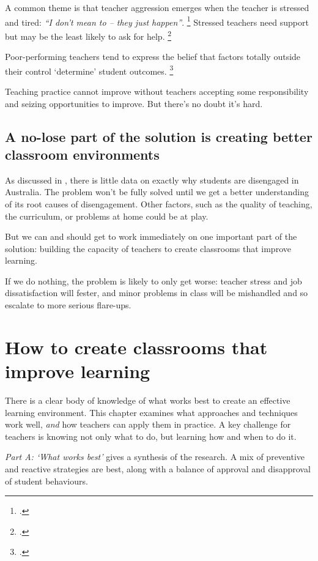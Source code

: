 \documentclass{grattan}
\begin{document}
A common theme is that teacher aggression emerges when the teacher is stressed and tired: \emph{``I don't mean to -- they just happen''}.%
    \footcite{RileyBrew2010WhyDidYouDoThat}
Stressed teachers need support but may be the least likely to ask for help.%
    \footcite{Lewis2001ClassroomDisciplineStudent}

Poor-performing teachers tend to express the belief that factors totally outside their control `determine' student outcomes.%
    \footcite{Lingard2001QueenslandSchoolReformFinalReport}

Teaching practice cannot improve without teachers accepting some responsibility and seizing opportunities to improve.
But there's no doubt it's hard.

\section{A no-lose part of the solution is creating better classroom environments}\label{sec:no-lose-part-of-solution}
As discussed in , there is little data on exactly why students are disengaged in Australia. The problem won't be fully solved until we get a better understanding of its root causes of disengagement. Other factors, such as the quality of teaching, the curriculum, or problems at home could be at play.

But we can and should get to work immediately on one important part of the solution: building the capacity of teachers to create classrooms that improve learning.

If we do nothing, the problem is likely to only get worse: teacher stress and job dissatisfaction will fester, and minor problems in class will be mishandled and so escalate to more serious flare-ups.

\chapter{How to create classrooms that improve learning}\label{chap:what-works-best}

There is a clear body of knowledge of what works best to create an effective learning environment. This chapter examines what approaches and techniques work well, \emph{and} how teachers can apply them in practice. A key challenge for teachers is knowing not only what to do, but learning how and when to do it.

\emph{Part A: `What works best'} gives a synthesis of the research. A mix of preventive and reactive strategies are best, along with a balance of approval and disapproval of student behaviours.
\end{document}
